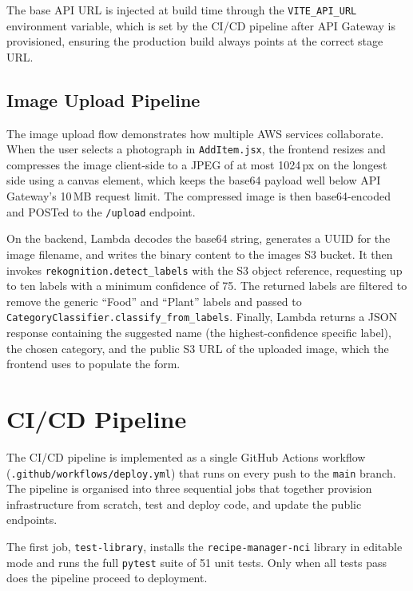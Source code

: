 \documentclass[conference]{IEEEtran}
\begin{document}
The base API URL is injected at build time through the \texttt{VITE\_API\_URL} environment variable, which is set by the CI/CD pipeline after API Gateway is provisioned, ensuring the production build always points at the correct stage URL.

\subsection{Image Upload Pipeline}

The image upload flow demonstrates how multiple AWS services collaborate. When the user selects a photograph in \texttt{AddItem.jsx}, the frontend resizes and compresses the image client-side to a JPEG of at most 1024\,px on the longest side using a canvas element, which keeps the base64 payload well below API Gateway's 10\,MB request limit. The compressed image is then base64-encoded and POSTed to the \texttt{/upload} endpoint.

On the backend, Lambda decodes the base64 string, generates a UUID for the image filename, and writes the binary content to the images S3 bucket. It then invokes \texttt{rekognition.detect\_labels} with the S3 object reference, requesting up to ten labels with a minimum confidence of 75. The returned labels are filtered to remove the generic ``Food'' and ``Plant'' labels and passed to \texttt{CategoryClassifier.classify\_from\_labels}. Finally, Lambda returns a JSON response containing the suggested name (the highest-confidence specific label), the chosen category, and the public S3 URL of the uploaded image, which the frontend uses to populate the form.

\section{CI/CD Pipeline}

The CI/CD pipeline is implemented as a single GitHub Actions workflow (\texttt{.github/workflows/deploy.yml}) that runs on every push to the \texttt{main} branch. The pipeline is organised into three sequential jobs that together provision infrastructure from scratch, test and deploy code, and update the public endpoints.

The first job, \texttt{test-library}, installs the \texttt{recipe-manager-nci} library in editable mode and runs the full \texttt{pytest} suite of 51 unit tests. Only when all tests pass does the pipeline proceed to deployment.
\end{document}
